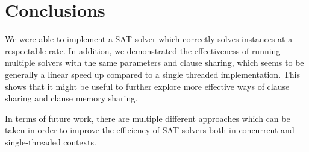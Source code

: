 \documentclass[11pt]{extarticle}
\begin{document}
\section*{Conclusions}
We were able to implement a SAT solver which correctly solves instances at a respectable rate.
In addition, we demonstrated the effectiveness of running multiple solvers with the same
parameters and clause sharing, which seems to be generally a linear speed up compared to a
single threaded implementation. This shows that it might be useful to further explore more
effective ways of clause sharing and clause memory sharing.

In terms of future work, there are multiple different approaches which can be taken in order to
improve the efficiency of SAT solvers both in concurrent and single-threaded contexts.
\end{document}
